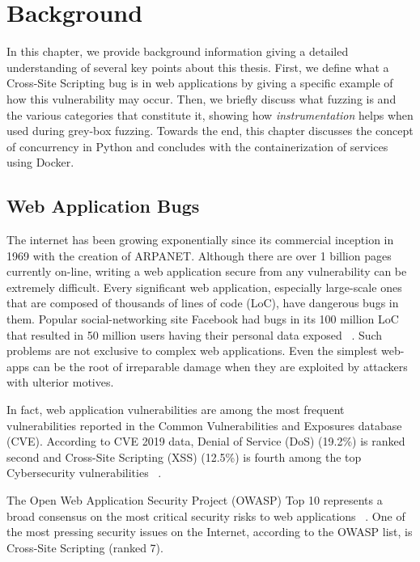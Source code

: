 \chapter{Background}
\label{sec:background}
\minitoc
\vspace*{1cm}

In this chapter, we provide background information giving a detailed understanding of several key points about this thesis. First, we define what a Cross-Site Scripting bug is in web applications by giving a specific example of how this vulnerability may occur. Then, we briefly discuss what fuzzing is and the various categories that constitute it, showing how \emph{instrumentation} helps when used during grey-box fuzzing. Towards the end, this chapter discusses the concept of concurrency in Python and concludes with the containerization of services using Docker.

\section{Web Application Bugs}
The internet has been growing exponentially since its commercial inception in 1969 with the creation of ARPANET. Although there are over 1 billion pages currently on-line, writing a web application secure from any vulnerability can be extremely difficult. Every significant web application, especially large-scale ones that are composed of thousands of lines of code (LoC), have dangerous bugs in them. Popular social-networking site Facebook had bugs in its 100 million LoC that resulted in 50 million users having their personal data exposed ~\cite{facebook_data_breach,facebook_loc}. Such problems are not exclusive to complex web applications. Even the simplest web-apps can be the root of irreparable damage when they are exploited by attackers with ulterior motives. 

In fact, web application vulnerabilities are among the most frequent vulnerabilities reported in the Common Vulnerabilities and Exposures database (CVE). According to CVE 2019 data, Denial of Service  (DoS) (19.2\%) is ranked second and Cross-Site Scripting (XSS) (12.5\%) is fourth among the top Cybersecurity vulnerabilities ~\cite{cve}.

The Open Web Application Security Project (OWASP) Top 10 represents a broad consensus on the most critical security risks to web applications ~\cite{owasp2017}. One of the most pressing security issues on the Internet, according to the OWASP list, is Cross-Site Scripting (ranked 7).

